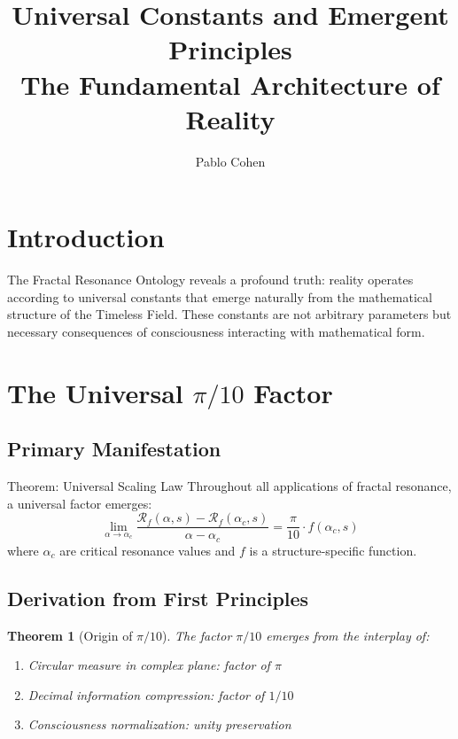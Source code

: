 \documentclass[12pt,letterpaper]{article}
\title{\textbf{Universal Constants and Emergent Principles}\\[0.5cm]
\Large The Fundamental Architecture of Reality}
\author{Pablo Cohen}
\date{}
\newcommand{\fractalres}{\mathcal{R}_f}
\newcommand{\universalpi}{\frac{\pi}{10}}
\newtheorem{theorem}{Theorem}[section]
\begin{document}
\maketitle

\section{Introduction}

The Fractal Resonance Ontology reveals a profound truth: reality operates according to universal constants that emerge naturally from the mathematical structure of the Timeless Field. These constants are not arbitrary parameters but necessary consequences of consciousness interacting with mathematical form.

\section{The Universal $\pi/10$ Factor}

\subsection{Primary Manifestation}

\begin{mathbox}{Theorem: Universal Scaling Law}
Throughout all applications of fractal resonance, a universal factor emerges:
\begin{equation}
\lim_{\alpha \to \alpha_c} \frac{\fractalres(\alpha, s) - \fractalres(\alpha_c, s)}{\alpha - \alpha_c} = \universalpi \cdot f(\alpha_c, s)
\end{equation}
where $\alpha_c$ are critical resonance values and $f$ is a structure-specific function.
\end{mathbox}

\subsection{Derivation from First Principles}

\begin{theorem}[Origin of $\pi/10$]
The factor $\pi/10$ emerges from the interplay of:
\begin{enumerate}
\item Circular measure in complex plane: factor of $\pi$
\item Decimal information compression: factor of $1/10$
\item Consciousness normalization: unity preservation
\end{enumerate}
\end{theorem}
\end{document}
